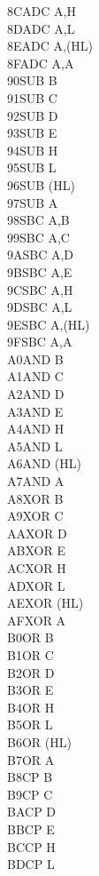 \documentclass[oneside,a4paper]{book}
\begin{document}
\begin{multicols}{3}
{\begin{tabbing}
8C\>ADC A,H\\
8D\>ADC A,L\\
8E\>ADC A,(HL)\\
8F\>ADC A,A\\
90\>SUB B\\
91\>SUB C\\
92\>SUB D\\
93\>SUB E\\
94\>SUB H\\
95\>SUB L\\
96\>SUB (HL)\\
97\>SUB A\\
98\>SBC A,B\\
99\>SBC A,C\\
9A\>SBC A,D\\
9B\>SBC A,E\\
9C\>SBC A,H\\
9D\>SBC A,L\\
9E\>SBC A,(HL)\\
9F\>SBC A,A\\
A0\>AND B\\
A1\>AND C\\
A2\>AND D\\
A3\>AND E\\
A4\>AND H\\
A5\>AND L\\
A6\>AND (HL)\\
A7\>AND A\\
A8\>XOR B\\
A9\>XOR C\\
AA\>XOR D\\
AB\>XOR E\\
AC\>XOR H\\
AD\>XOR L\\
AE\>XOR (HL)\\
AF\>XOR A\\
B0\>OR B\\
B1\>OR C\\
B2\>OR D\\
B3\>OR E\\
B4\>OR H\\
B5\>OR L\\
B6\>OR (HL)\\
B7\>OR A\\
B8\>CP B\\
B9\>CP C\\
BA\>CP D\\
BB\>CP E\\
BC\>CP H\\
BD\>CP L\\

\end{tabbing}}
\end{multicols}
\end{document}
